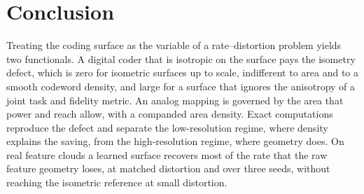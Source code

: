 \documentclass[journal]{IEEEtran}
\begin{document}
\section{Conclusion}
Treating the coding surface as the variable of a rate--distortion problem yields two functionals. A digital coder that is isotropic on the surface pays the isometry defect, which is zero for isometric surfaces up to scale, indifferent to area and to a smooth codeword density, and large for a surface that ignores the anisotropy of a joint task and fidelity metric. An analog mapping is governed by the area that power and reach allow, with a companded area density. Exact computations reproduce the defect and separate the low-resolution regime, where density explains the saving, from the high-resolution regime, where geometry does. On real feature clouds a learned surface recovers most of the rate that the raw feature geometry loses, at matched distortion and over three seeds, without reaching the isometric reference at small distortion.


\end{document}
